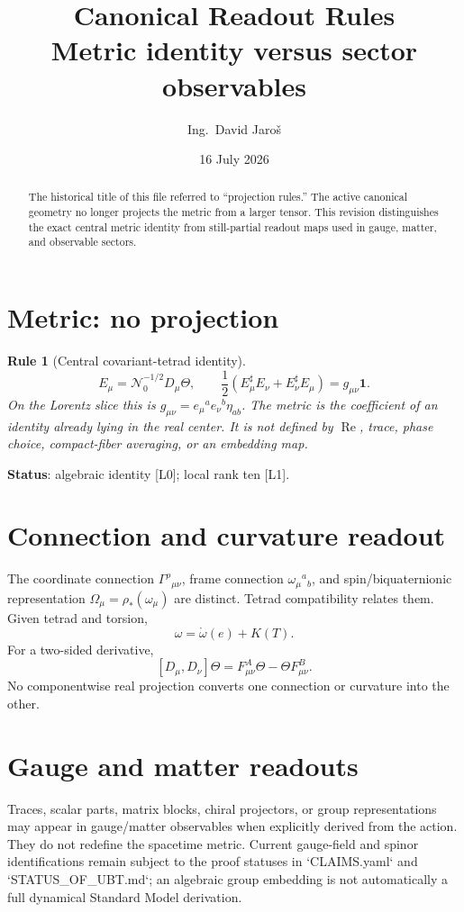\documentclass[11pt,a4paper]{article}
\title{Canonical Readout Rules\\\large Metric identity versus sector observables}
\author{Ing.\ David Jaroš}
\date{16 July 2026}
\newtheorem{rule}{Rule}
\begin{document}
\maketitle

\begin{abstract}
The historical title of this file referred to ``projection rules.''  The active
canonical geometry no longer projects the metric from a larger tensor.  This
revision distinguishes the exact central metric identity from still-partial
readout maps used in gauge, matter, and observable sectors.
\end{abstract}

\section{Metric: no projection}

\begin{rule}[Central covariant-tetrad identity]
\[
 E_\mu=\mathcal N_0^{-1/2}D_\mu\Theta,
 \qquad
 \boxed{\frac12(E_\mu^\sharp E_\nu+E_\nu^\sharp E_\mu)
       =g_{\mu\nu}\mathbf1.}
\]
On the Lorentz slice this is
$g_{\mu\nu}=e_\mu{}^ae_\nu{}^b\eta_{ab}$.  The metric is the coefficient of
an identity already lying in the real center.  It is not defined by
$\operatorname{Re}$, trace, phase choice, compact-fiber averaging, or an
embedding map.
\end{rule}

\noindent\textbf{Status}: algebraic identity [L0]; local rank ten [L1].

\section{Connection and curvature readout}

The coordinate connection $\Gamma^\rho{}_{\mu\nu}$, frame connection
$\omega_\mu{}^a{}_b$, and spin/biquaternionic representation
$\Omega_\mu=\rho_*(\omega_\mu)$ are distinct.  Tetrad compatibility relates
them.  Given tetrad and torsion,
\[
 \omega=\mathring\omega(e)+K(T).
\]
For a two-sided derivative,
\[
 [D_\mu,D_\nu]\Theta
 =F^A_{\mu\nu}\Theta-\Theta F^B_{\mu\nu}.
\]
No componentwise real projection converts one connection or curvature into the
other.

\section{Gauge and matter readouts}

Traces, scalar parts, matrix blocks, chiral projectors, or group representations
may appear in gauge/matter observables when explicitly derived from the action.
They do not redefine the spacetime metric.  Current gauge-field and spinor
identifications remain subject to the proof statuses in `CLAIMS.yaml` and
`STATUS_OF_UBT.md`; an algebraic group embedding is not automatically a full
dynamical Standard Model derivation.
\end{document}
